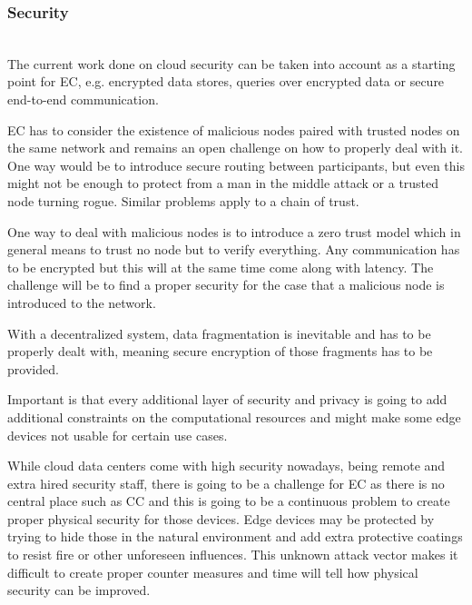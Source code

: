 \subsubsection{Security}\hspace*{\fill} \\
The current work done on cloud security can be taken into account as a starting point for EC, e.g. encrypted data stores, queries over encrypted data or secure end-to-end communication.

EC has to consider the existence of malicious nodes paired with trusted nodes on the same network and remains an open challenge on how to properly deal with it.
One way would be to introduce secure routing between participants, but even this might not be enough to protect from a man in the middle attack or a trusted node turning rogue. Similar problems apply to a chain of trust.

One way to deal with malicious nodes is to introduce a zero trust model which in general means to trust no node but to verify everything. Any communication has to be encrypted but this will at the same time come along with latency.
The challenge will be to find a proper security for the case that a malicious node is introduced to the network.

With a decentralized system, data fragmentation is inevitable and has to be properly dealt with, meaning secure encryption of those fragments has to be provided.

Important is that every additional layer of security and privacy is going to add additional constraints on the computational resources and might make some edge devices not usable for certain use cases.

While cloud data centers come with high security nowadays, being remote and extra hired security staff, there is going to be a challenge for EC as there is no central place such as CC and this is going to be a continuous problem to create proper physical security for those devices. 
Edge devices may be protected by trying to hide those in the natural environment and add extra protective coatings to resist fire or other unforeseen influences. This unknown attack vector makes it difficult to create proper counter measures and time will tell how physical security can be improved.